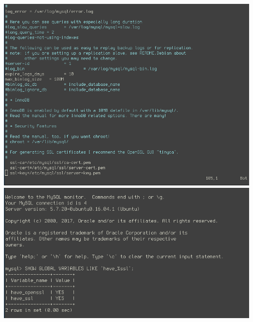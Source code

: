 \documentclass[9pt]{article}
\begin{document}
\includegraphics[width=\textwidth]{mysql_conf-ssl}
\includegraphics[width=\textwidth]{mysql_ssl-enabled}
\end{document}
